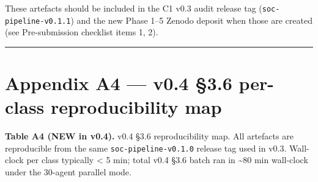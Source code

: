 \documentclass[
  11pt]{article}
\begin{document}
These artefacts should be included in the C1 v0.3 audit release tag
(\texttt{soc-pipeline-v0.1.1}) and the new Phase 1--5 Zenodo deposit
when those are created (see Pre-submission checklist items 1, 2).

\begin{center}\rule{0.5\linewidth}{0.5pt}\end{center}

\section*{Appendix A4 --- v0.4 §3.6 per-class reproducibility
map}\label{appendix-a4--v04-per-class-reproducibility-map}

\textbf{Table A4 (NEW in v0.4).} v0.4 §3.6 reproducibility map. All
artefacts are reproducible from the same \texttt{soc-pipeline-v0.1.0}
release tag used in v0.3. Wall-clock per class typically < 5 min; total
v0.4 §3.6 batch ran in \textasciitilde 80 min wall-clock under the
30-agent parallel mode.
\end{document}
